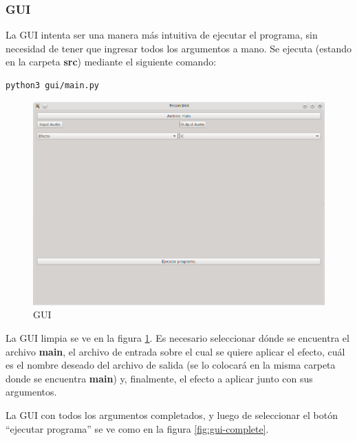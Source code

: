 \subsubsection{GUI}
\label{subsec:gui}
La GUI intenta ser una manera más intuitiva de ejecutar el programa, sin necesidad de tener que ingresar todos los argumentos a mano. Se ejecuta (estando en la carpeta \textbf{src}) mediante el siguiente comando:

\lstset{language=bash}
\begin{lstlisting}[frame=single]
python3 gui/main.py
\end{lstlisting}

\begin{figure}[H]
    \centering
    \includegraphics[scale=0.68]{imagenes/gui.png}
    \caption{GUI}
    \label{fig:gui}
\end{figure}

La GUI limpia se ve en la figura \ref{fig:gui}. Es necesario seleccionar dónde se encuentra el archivo \textbf{main}, el archivo de entrada sobre el cual se quiere aplicar el efecto, cuál es el nombre deseado del archivo de salida (se lo colocará en la misma carpeta donde se encuentra \textbf{main}) y, finalmente, el efecto a aplicar junto con sus argumentos.\vspace{\baselineskip}

La GUI con todos los argumentos completados, y luego de seleccionar el botón ``ejecutar programa'' se ve como en la figura \ref{fig:gui-complete}.\vspace{\baselineskip}

